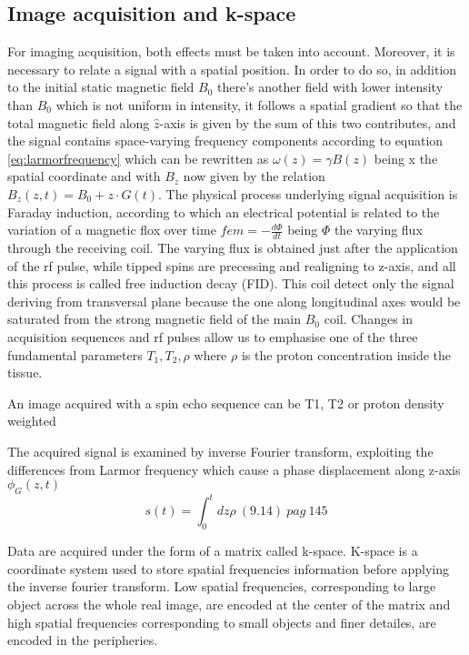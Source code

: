 \documentclass[a4paper,11pt]{article}
\begin{document}
\subsection{Image acquisition and k-space}
For imaging acquisition, both effects must be taken into account. Moreover, it is necessary to relate a signal with a spatial position.
In order to do so, in addition to the initial static magnetic field $B_0$ there's another field with lower intensity than $B_0$ which is not uniform in intensity, it follows a spatial gradient so that the total magnetic field along $\hat z$-axis is given by the sum of this two contributes, and the signal contains space-varying frequency components according to equation \ref{eq:larmorfrequency} which can be rewritten as $\omega(z) = \gamma B(z)$ being x the spatial coordinate and with $B_z$ now given by the relation $B_z(z, t) = B_0 + z\cdot G(t)$.
The physical process underlying signal acquisition is Faraday induction, according to which an electrical potential is related to the variation of a magnetic flox over time $fem = -\frac{d\Phi}{dt}$ being $\Phi$ the varying flux through the receiving coil.
The varying flux is obtained just after the application of the rf pulse, while tipped spins are precessing and realigning to z-axis, and all this process is called free induction decay (FID). This coil detect only the signal deriving from transversal plane because the one along longitudinal axes would be saturated from the strong magnetic field of the main $B_0$ coil. Changes in acquisition sequences and rf pulses allow us to emphasise one of the three fundamental parameters $T_1, T_2, \rho$ where $\rho$ is the proton concentration inside the tissue.

An image acquired with a spin echo sequence can be T1, T2 or proton density weighted

The acquired signal is examined by inverse Fourier transform, exploiting the differences from Larmor frequency which cause a phase displacement along z-axis $\phi_G(z, t)$
\begin{equation}
s(t) = \int_0^tdz\rho \ (9.14) \ pag \ 145
\end{equation}

Data are acquired under the form of a matrix called k-space.
K-space is a coordinate system used to store spatial frequencies information before applying the inverse fourier transform.
Low spatial frequencies, corresponding to large object across the whole real image, are encoded at the center of the matrix and high spatial frequencies corresponding to small objects and finer detailes, are encoded in the peripheries.
\end{document}
